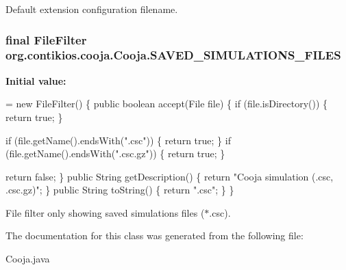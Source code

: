 Default extension configuration filename. \hypertarget{classorg_1_1contikios_1_1cooja_1_1Cooja_a378fe78babb39ed68123203dc7ba01f4}{
\subsubsection[{S\-A\-V\-E\-D\-\_\-\-S\-I\-M\-U\-L\-A\-T\-I\-O\-N\-S\-\_\-\-F\-I\-L\-E\-S}]{\setlength{\rightskip}{0pt plus 5cm}final File\-Filter org.\-contikios.\-cooja.\-Cooja.\-S\-A\-V\-E\-D\-\_\-\-S\-I\-M\-U\-L\-A\-T\-I\-O\-N\-S\-\_\-\-F\-I\-L\-E\-S\hspace{0.3cm}{\ttfamily [static]}}}\label{classorg_1_1contikios_1_1cooja_1_1Cooja_a378fe78babb39ed68123203dc7ba01f4}
{\bfseries Initial value\-:}
\begin{DoxyCode}
= \textcolor{keyword}{new} FileFilter() \{
    \textcolor{keyword}{public} \textcolor{keywordtype}{boolean} accept(File file) \{
      \textcolor{keywordflow}{if} (file.isDirectory()) \{
        \textcolor{keywordflow}{return} \textcolor{keyword}{true};
      \}

      \textcolor{keywordflow}{if} (file.getName().endsWith(\textcolor{stringliteral}{".csc"})) \{
        \textcolor{keywordflow}{return} \textcolor{keyword}{true};
      \}
      \textcolor{keywordflow}{if} (file.getName().endsWith(\textcolor{stringliteral}{".csc.gz"})) \{
        \textcolor{keywordflow}{return} \textcolor{keyword}{true};
      \}

      \textcolor{keywordflow}{return} \textcolor{keyword}{false};
    \}
    \textcolor{keyword}{public} String getDescription() \{
      \textcolor{keywordflow}{return} \textcolor{stringliteral}{"Cooja simulation (.csc, .csc.gz)"};
    \}
    \textcolor{keyword}{public} String toString() \{
      \textcolor{keywordflow}{return} \textcolor{stringliteral}{".csc"};
    \}
  \}
\end{DoxyCode}
File filter only showing saved simulations files ($\ast$.csc). 

The documentation for this class was generated from the following file\-:\begin{DoxyCompactItemize}
\item 
Cooja.\-java\end{DoxyCompactItemize}
